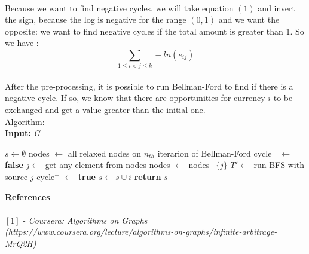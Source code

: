 \documentclass{article}
\begin{document}
\\
Because we want to find negative cycles, we will take equation $(1)$ and invert the sign, because the log is negative for the range $(0, 1)$ and we want the opposite: we want to find negative cycles if the total amount is greater than 1. So we have :
\begin{equation}
\sum_{1 \leq i < j \leq k} - ln(e_{ij}) 
\end{equation}
\\
After the pre-processing, it is possible to run Bellman-Ford to find if there is a negative cycle. If so, we know that there are opportunities for currency $i$ to be exchanged and get a value greater than the initial one.
\\
Algorithm:\\
\textbf{Input:} \textit{G}
\begin{algorithmic}
\State $s \gets \emptyset$
  \State nodes $\gets$ all relaxed nodes on $n_{th}$ iterarion of Bellman-Ford
  \State cycle$^{-}$ $\gets$ \textbf{false}
    \State $j \gets $ get any element from nodes
    \State nodes $\gets$ nodes$- \{j\}$
    \State $T' \gets $ run BFS with source $j$
      \State cycle$^{-}$ $\gets$ \textbf{true}
    \EndIf
  \EndWhile
    \State $s \gets s \cup {i}$
  \EndIf
\EndFor
\State \textbf{return} $s$
\end{algorithmic}
\textbf{References}
\\
\\ $[1]$ - \textit{Coursera: Algorithms on Graphs (https://www.coursera.org/lecture/algorithms-on-graphs/infinite-arbitrage-MrQ2H)}
\end{document}

